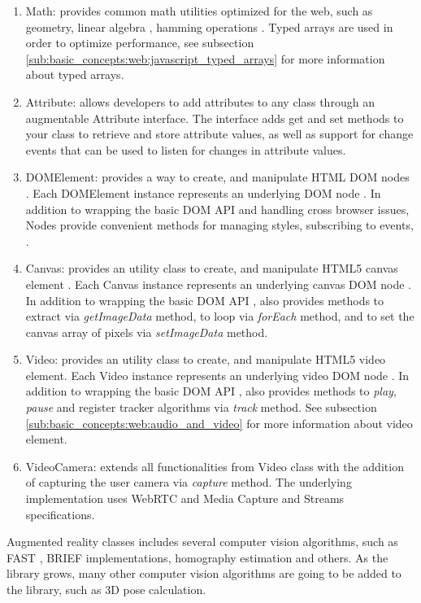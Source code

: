 \begin{enumerate}
  \item Math: provides common math utilities optimized for the web, such as geometry, linear algebra \cite{Hartley2004}, hamming operations \etc. Typed arrays \cite{TypedArray2013} are used in order to optimize performance, see subsection \ref{sub:basic_concepts:web:javascript_typed_arrays} for more information about typed arrays.
  \item Attribute: allows developers to add attributes to any class through an augmentable Attribute interface. The interface adds get and set methods to your class to retrieve and store attribute values, as well as support for change events that can be used to listen for changes in attribute values.
  \item DOMElement: provides a way to create, and manipulate HTML \cite{Hickson2013} DOM nodes \cite{WC2006}. Each DOMElement instance represents an underlying DOM node \cite{WC2006}. In addition to wrapping the basic DOM API \cite{WC2006} and handling cross browser issues, Nodes provide convenient methods for managing styles, subscribing to events, \etc.
  \item Canvas: provides an utility class to create, and manipulate HTML5 \cite{Hickson2013} canvas element \cite{Canvas2013}. Each Canvas instance represents an underlying canvas DOM node \cite{Canvas2013}. In addition to wrapping the basic DOM API \cite{WC2006}, also provides methods to extract via \textit{getImageData} method, to loop via \textit{forEach} method, and to set the canvas array of pixels via \textit{setImageData} method.
  \item Video: provides an utility class to create, and manipulate HTML5 \cite{Hickson2013} video element. Each Video instance represents an underlying video DOM node \cite{Canvas2013}. In addition to wrapping the basic DOM API \cite{WC2006}, also provides methods to \textit{play}, \textit{pause} and register tracker algorithms via \textit{track} method. See subsection \ref{sub:basic_concepts:web:audio_and_video} for more information about video element.
  \item VideoCamera: extends all functionalities from Video class with the addition of capturing the user camera via \textit{capture} method. The underlying implementation uses WebRTC \cite{WebRTC2013} and Media Capture and Streams \cite{MediaCapture2013} specifications.
\end{enumerate}

Augmented reality classes includes several computer vision algorithms, such as FAST \cite{RostenFaster2010}, BRIEF \cite{Calonder2010} implementations, homography estimation and others. As the library grows, many other computer vision algorithms are going to be added to the library, such as 3D pose calculation.

